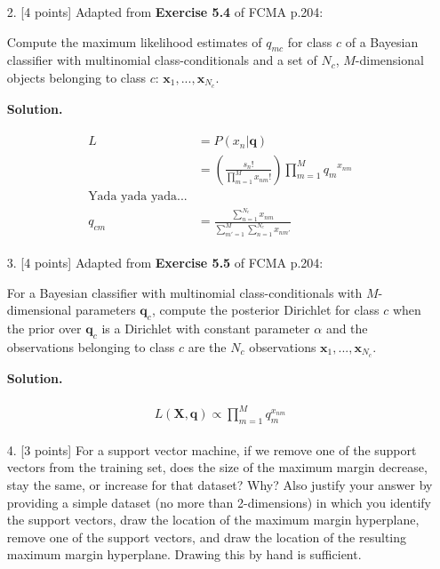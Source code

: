 \documentclass[10pt]{article}
\begin{document}
\begin{itemize}
\item[2.]  [4 points]
Adapted from {\bf Exercise 5.4} of FCMA p.204:

Compute the maximum likelihood estimates of $q_{mc}$ for class $c$ of a Bayesian classifier with multinomial class-conditionals and a set of $N_c$, $M$-dimensional objects belonging to class $c$: $\mathbf{x}_1, ..., \mathbf{x}_{N_c}$.

{\bf Solution.} %

\begin{eqnarray*}
\begin{aligned}
L &= P(x_n | \mathbf{q})
\\
&= \left( \frac{s_n !}{\prod_{m=1}^M x_{nm} !} \right)
\prod_{m=1}^M {q_m}^{x_{nm}}
\\
\text{Yada yada yada...}
\\
q_{cm} &= \frac{ \sum_{n=1}^{N_c} x_{nm} } { \sum_{m'=1}^M \sum_{n=1}^{N_c} x_{nm'} }
\end{aligned}
\end{eqnarray*}


\item[3.]  [4 points]  
Adapted from {\bf Exercise 5.5} of FCMA p.204:

For a Bayesian classifier with multinomial class-conditionals with $M$-dimensional parameters $\mathbf{q}_c$, compute the posterior Dirichlet for class $c$ when the prior over $\mathbf{q}_c$ is a Dirichlet with constant parameter $\alpha$ and the observations belonging to class $c$ are the $N_c$ observations $\mathbf{x}_1, ..., \mathbf{x}_{N_c}$.

{\bf Solution.} %

\begin{eqnarray*}
\begin{aligned}
L(\mathbf{X}, \mathbf{q}) \propto \prod_{m=1}^M q_m^{x_{nm}}
\end{aligned}
\end{eqnarray*}

\item[4.]  [3 points]
For a support vector machine, if we remove one of the support vectors from the training set, does the size of the maximum margin decrease, stay the same, or increase for that dataset?  Why?  Also justify your answer by providing a simple dataset (no more than 2-dimensions) in which you identify the support vectors, draw the location of the maximum margin hyperplane, remove one of the support vectors, and draw the location of the resulting maximum margin hyperplane.  Drawing this by hand is sufficient.


\end{itemize}
\end{document}
